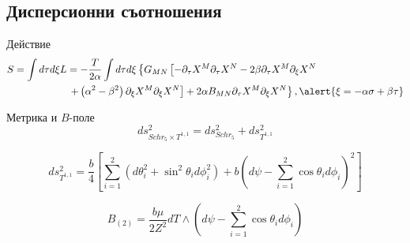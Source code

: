 \documentclass[bulg]{beamer}
\begin{document}
  \subsection{Дисперсионни съотношения}
  \begin{frame}{}
    \begin{alertblock}{Действие}
      \vspace{-0.2cm}
  \begin{align*}
    S=\int d \tau d \xi L&=-\frac{T}{2 \alpha} \int d \tau d \xi \left\{G_{M N}\left[-\partial_{\tau} X^{M} \partial_{\tau} X^{N}-2 \beta \partial_{\tau} X^{M} \partial_{\xi} X^{N}\right.\right.\\
   &\left.\left.+\left(\alpha^{2}-\beta^{2}\right) \partial_{\xi} X^{M}
   \partial_{\xi} X^{N}\right]+2 \alpha B_{M N} \partial_{\tau} X^{M}
 \partial_{\xi} X^{N}\right\},
 \alert{\xi = -\alpha\sigma + \beta\tau}
  \end{align*}
  \end{alertblock}
  \begin{exampleblock}{Метрика и $B$-поле}
    \small
  \begin{equation*}
  ds^2_{Schr_{5} \times T^{1,1}}=d s_{S c h r_{5}}^{2}+d s_{T^{1,1}}^{2}
  \end{equation*}

  \begin{equation*}
  d s_{T^{1,1}}^{2}=\frac{b}{4}\left[\sum_{i=1}^{2}\left(d \theta_{i}^{2}+\sin
  ^{2} \theta_{i} d \phi_{i}^{2}\right)+b\left(d \psi-\sum_{i=1}^{2} \cos
  \theta_{i} d \phi_{i}\right)^{2}\right]
  \end{equation*}

\begin{equation*}
  B_{(2)} = \frac{b\mu}{2Z^2}dT \wedge \left(d\psi - \sum_{i=1}^2 \cos\theta_i
  d\phi_i\right)
\end{equation*}
\end{exampleblock}
\end{frame}
\end{document}
